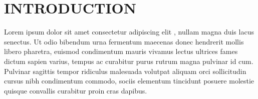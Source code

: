 \documentclass[11pt,twoside]{report}
\date{June 2023}
\begin{document}



\clearpage{\pagestyle{empty}\cleardoublepage}
\setcounter{page}{1}
\pagestyle{fancy}




\tableofcontents 
\thispagestyle{empty}

\clearpage%
\setcounter{page}{1}
\fancyhead[LE,RO]{\slshape \rightmark}
\fancyhead[LO,RE]{\slshape \leftmark}

\fancyhead{} %

\chapter*{INTRODUCTION}
Lorem ipsum dolor sit amet consectetur adipiscing elit \citep{wang_high-resolution_2018}, nullam magna duis lacus senectus. Ut odio bibendum urna fermentum maecenas donec hendrerit mollis libero pharetra, euismod condimentum mauris vivamus lectus ultrices fames dictum sapien varius, tempus ac curabitur purus rutrum magna pulvinar id cum. Pulvinar sagittis tempor ridiculus malesuada volutpat aliquam orci sollicitudin cursus nibh condimentum commodo, sociis elementum tincidunt posuere molestie quisque convallis curabitur proin cras dapibus.
\end{document}
